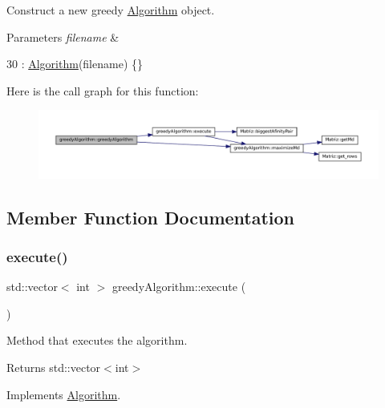 Construct a new greedy \hyperlink{classAlgorithm}{Algorithm} object. 


\begin{DoxyParams}{Parameters}
{\em filename} & \\
\hline
\end{DoxyParams}

\begin{DoxyCode}
30 : \hyperlink{classAlgorithm_a89df1d2c6751f70733f38daa0ee2a13b}{Algorithm}(filename) \{\}
\end{DoxyCode}
Here is the call graph for this function\+:
\nopagebreak
\begin{figure}[H]
\begin{center}
\leavevmode
\includegraphics[width=350pt]{classgreedyAlgorithm_acd4c3a073c8ed2e93bbf402363ebd71d_cgraph}
\end{center}
\end{figure}


\subsection{Member Function Documentation}
\mbox{\label{classgreedyAlgorithm_a37c81600b24a32ae25b6f0eeab643a7a}} 
\subsubsection{\texorpdfstring{execute()}{execute()}}
{\footnotesize\ttfamily std\+::vector$<$ int $>$ greedy\+Algorithm\+::execute (\begin{DoxyParamCaption}{ }\end{DoxyParamCaption})\hspace{0.3cm}{\ttfamily [virtual]}}



Method that executes the algorithm. 

\begin{DoxyReturn}{Returns}
std\+::vector$<$int$>$ 
\end{DoxyReturn}


Implements \hyperlink{classAlgorithm_af6ea9eb9a6dbd41896e3fd7dabac096b}{Algorithm}.


